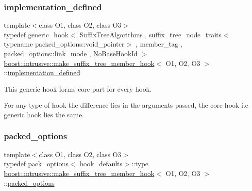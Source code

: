 \subsubsection{\texorpdfstring{implementation\+\_\+defined}{implementation\_defined}}
{\footnotesize\ttfamily template$<$class O1, class O2, class O3$>$ \\
typedef generic\+\_\+hook$<$ Suffix\+Tree\+Algorithms , suffix\+\_\+tree\+\_\+node\+\_\+traits$<$typename packed\+\_\+options\+::void\+\_\+pointer$>$ , member\+\_\+tag , packed\+\_\+options\+::link\+\_\+mode , No\+Base\+Hook\+Id $>$ \hyperlink{classboost_1_1intrusive_1_1make__suffix__tree__member__hook}{boost\+::intrusive\+::make\+\_\+suffix\+\_\+tree\+\_\+member\+\_\+hook}$<$ O1, O2, O3 $>$\+::\hyperlink{classboost_1_1intrusive_1_1make__suffix__tree__member__hook_a933f8ac391dbd99a5f61386b58a04d60}{implementation\+\_\+defined}}


\begin{DoxyItemize}
\item This generic hook forms core part for every hook.  
\item For any type of hook the difference lies in the arguments passed, the core hook i.\+e generic hook lies the same. 
\end{DoxyItemize}\mbox{\label{classboost_1_1intrusive_1_1make__suffix__tree__member__hook_a2a13362c40f5ef968999753023916ccb}} 
\subsubsection{\texorpdfstring{packed\+\_\+options}{packed\_options}}
{\footnotesize\ttfamily template$<$class O1, class O2, class O3$>$ \\
typedef pack\+\_\+options$<$ hook\+\_\+defaults$>$\+::\hyperlink{classboost_1_1intrusive_1_1make__suffix__tree__member__hook_ad60aeb75c91f8af7d26f667cecb0b8d9}{type} \hyperlink{classboost_1_1intrusive_1_1make__suffix__tree__member__hook}{boost\+::intrusive\+::make\+\_\+suffix\+\_\+tree\+\_\+member\+\_\+hook}$<$ O1, O2, O3 $>$\+::\hyperlink{classboost_1_1intrusive_1_1make__suffix__tree__member__hook_a2a13362c40f5ef968999753023916ccb}{packed\+\_\+options}}

